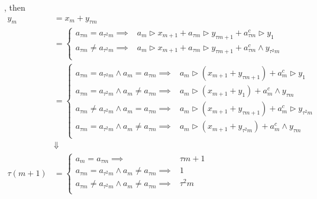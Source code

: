 , then
\begin{equation}\begin{split}
	y_m &= x_m + y_{\tau m} \\
		&= \begin{cases}
			a_{\tau m}=a_{\tau^2 m}\implies & a_m\rhd x_{m+1} + a_{\tau m}\rhd y_{\tau m+1} + a_{\tau m}^c\rhd y_{1} \\
			a_{\tau m}\not=a_{\tau^2 m}\implies & a_m\rhd x_{m+1} + a_{\tau m}\rhd y_{\tau m+1} + a_{\tau m}^c\wedge y_{\tau^2 m} \\
			\end{cases} \\
		&= \begin{cases}
			a_{\tau m}=a_{\tau^2 m}\wedge a_m=a_{\tau m}\implies & a_m\rhd (x_{m+1} + y_{\tau m+1}) + a_m^c\rhd y_{1} \\
			a_{\tau m}=a_{\tau^2 m}\wedge a_m\not=a_{\tau m}\implies & a_m\rhd (x_{m+1} + y_{1}) + a_m^c\wedge y_{\tau m} \\
			a_{\tau m}\not=a_{\tau^2 m}\wedge a_m=a_{\tau m}\implies & a_m\rhd (x_{m+1} + y_{\tau m+1}) + a_m^c\rhd y_{\tau^2 m} \\
			a_{\tau m}=a_{\tau^2 m}\wedge a_m\not=a_{\tau m}\implies & a_m\rhd (x_{m+1} + y_{\tau^2 m}) + a_m^c\wedge y_{\tau m} \\
			\end{cases} \\
		&\Downarrow \\
	\tau(m+1) &= \begin{cases}
		a_m=a_{\tau m}\implies & \tau m + 1 \\
		a_{\tau m}=a_{\tau^2 m}\wedge a_m\not=a_{\tau m}\implies & 1 \\
		a_{\tau m}\not=a_{\tau^2 m}\wedge a_m\not=a_{\tau m}\implies & \tau^2 m \\
		\end{cases} \\
\end{split}\end{equation}

